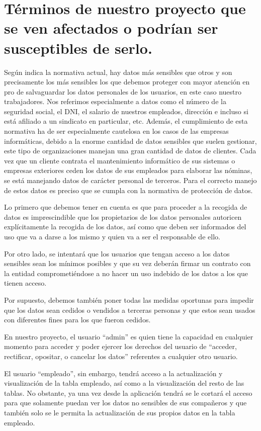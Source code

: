 \newpage
\section{Términos de nuestro proyecto que se ven afectados o podrían ser susceptibles de serlo.}
	Según indica la normativa actual, hay datos más sensibles que otros y son precisamente los más sensibles los que debemos proteger con mayor atención en pro de salvaguardar los datos personales de los usuarios, en este caso nuestro trabajadores. Nos referimos especialmente a datos como el número de la seguridad social, el DNI, el salario de nuestros empleados, dirección e incluso si está afiliado a un sindicato en particular, etc. Además, el cumplimiento de esta normativa ha de ser especialmente cautelosa en los casos de las empresas informáticas, debido a la enorme cantidad de datos sensibles que suelen gestionar, este tipo de organizaciones manejan una gran cantidad de datos de clientes. Cada vez que un cliente contrata el mantenimiento informático de sus sistemas o empresas exteriores ceden los datos de sus empleados para elaborar las nóminas, se está manejando datos de carácter personal de terceros. Para el correcto manejo de estos datos es preciso que se cumpla con la normativa de protección de datos.
	
	\newp Lo primero que debemos tener en cuenta es que para proceder a la recogida de datos es imprescindible que los propietarios de los datos personales autoricen explícitamente la recogida de los datos, así como que deben ser informados del uso que va a darse a los mismo y quien va a ser el responsable de ello.
	
	\newp Por otro lado, se intentará que los usuarios  que tengan acceso a los datos sensibles sean los mínimos posibles y que su vez deberán firmar un contrato con la entidad comprometiéndose a no hacer un uso indebido de los datos a los que tienen acceso.
	
	\newp Por supuesto, debemos también poner todas las medidas oportunas para impedir que los datos sean cedidos o vendidos a terceras personas y que estos sean usados con diferentes fines para los que fueron cedidos.
	
	\newp En nuestro proyecto, el usuario “admin” es quien tiene la capacidad en cualquier momento para acceder y poder ejercer los derechos del usuario de “acceder, rectificar, opositar, o cancelar los datos” referentes a cualquier otro usuario.
	
	\newp El usuario “empleado”, sin embargo, tendrá acceso a la actualización y visualización de la tabla empleado, así como a la visualización del resto de las tablas. No obstante, ya una vez desde la aplicación tendrá se le cortará el acceso para que solamente puedan ver los datos no sensibles de sus compañeros y que también solo se le permita la actualización de sus propios datos en la tabla empleado.
	
